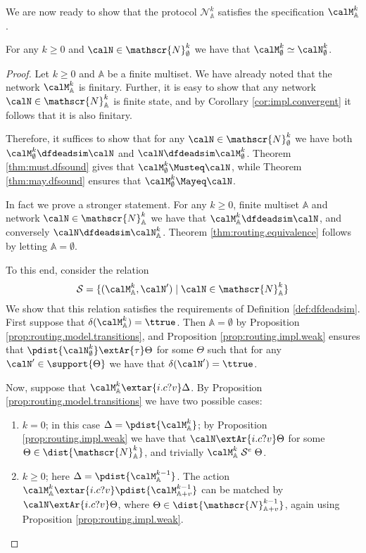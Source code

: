 \documentclass{LMCS}
\begin{document}
\noindent We are now ready to show that the protocol $\mathscr{N}^k_{\mathbb{A}}$ 
satisfies the specification $\calM^k_{\mathbb{A}}$.
\begin{thm}
\label{thm:routing.equivalence}
For any $k \geq 0$ and $\calN \in \mathscr{N}^k_{\emptyset}$ 
we have that $\calM^k_{\emptyset} \simeq \calN^k_{\emptyset}$. 
\end{thm}

\begin{proof}
Let $k \geq 0$ and $\mathbb{A}$ be a finite multiset. 
We have already noted that the network $\calM^k_{\mathbb{A}}$  
is finitary. Further, it is easy to show that any network 
$\calN \in \mathscr{N}^k_{\mathbb{A}}$ is finite state, 
and by Corollary \ref{cor:impl.convergent} it follows that 
it is also finitary.

Therefore, it suffices to show that for any $\calN \in \mathscr{N}^k_{\emptyset}$ 
we have both $\calM^k_{\emptyset} \dfdeadsim \calN$ and 
$\calN \dfdeadsim \calM^k_{\emptyset}$. Theorem 
\ref{thm:must.dfsound} gives that $\calM^k_{\emptyset} \Musteq 
\calN$, while Theorem \ref{thm:may.dfsound} ensures that 
$\calM^k_{\emptyset} \Mayeq \calN$. 

In fact we prove a stronger statement. 
For any $k \geq 0$, finite multiset $\mathbb{A}$ 
and network $\calN \in \mathscr{N}^k_{\mathbb{A}}$ 
we have that $\calM^k_{\mathbb{A}} \dfdeadsim \calN$, 
and conversely $\calN \dfdeadsim \calN^k_{\mathbb{A}}$.
Theorem \ref{thm:routing.equivalence} follows by 
letting $\mathbb{A} = \emptyset$.

To this end, consider the relation
\[
{\mathcal S} = \{(\calM^k_{\mathbb{A}}, \calN') \;|\; \calN \in \mathscr{N}^k_{\mathbb{A}}\}
\]
\noindent
We show that this relation satisfies the requirements of 
Definition \ref{def:dfdeadsim}. 
First suppose that $\delta(\calM^k_{\mathbb{A}}) = \ttrue$. 
Then $\mathbb{A} = \emptyset$ by Proposition 
\ref{prop:routing.model.transitions}, and
Proposition \ref{prop:routing.impl.weak} ensures that 
$\pdist{\calN^k_{\emptyset}} \extAr{\tau} \Theta$ 
for some $\Theta$ such that for any $\calN' \in \support{\Theta}$ 
we have that $\delta(\calN') = \ttrue$. 

Now, suppose that $\calM^k_{\mathbb{A}} \extar{i.c?v} \Delta$. 
By Proposition \ref{prop:routing.model.transitions} we have 
two possible cases: 

\begin{enumerate}
\item $k = 0$; in this case $\Delta = \pdist{\calM^k_{\mathbb{A}}}$; 
by Proposition \ref{prop:routing.impl.weak} we have 
that $\calN \extAr{i.c?v} \Theta$ for some $\Theta \in 
\dist{\mathscr{N}^k_{\mathbb{A}}}$, and trivially 
$\calM^k_{\mathbb{A}} \;{\mathcal S}^e\; \Theta$. 
\item $k \geq 0$; here $\Delta = \pdist{\calM^{k-1}_{\mathbb{A}}}$. 
The action $\calM^k_{\mathbb{A}} \extar{i.c?v} \pdist{\calM^{k-1}_{\mathbb{A}+v}}$ 
can be matched by $\calN \extAr{i.c?v} \Theta$, 
where $\Theta \in \dist{\mathscr{N}^{k-1}_{\mathbb{A} + v}}$, 
again using Proposition \ref{prop:routing.impl.weak}.
\end{enumerate}


\end{proof}
\end{document}
